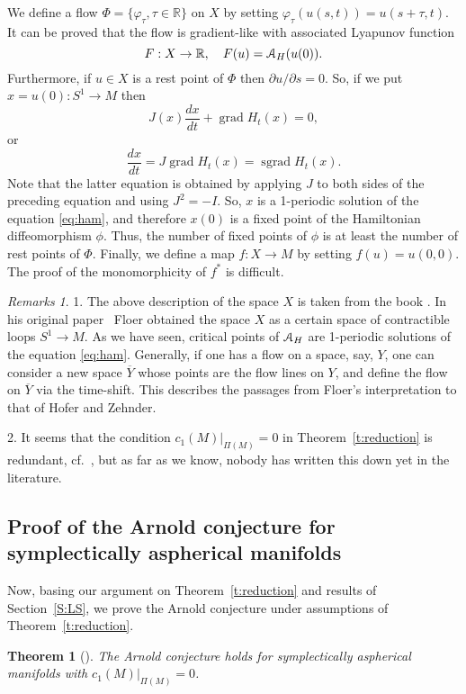 \documentclass[12pt]{amsart}
\newcommand{\B}[1]{{\mathbb #1}}
\newcommand{\C}[1]{{\EuScript #1}}
\newcommand\R{\B R}
\newtheorem{thm}[subsection]{Theorem}
\numberwithin{equation}{section}
\theoremstyle{definition}
\theoremstyle{remark}
\newtheorem{remarks}[subsection]{Remarks}
\newcommand\theoref{Theorem~\ref}
\numberwithin{figure}{section}
\numberwithin{table}{section}
\newcommand{\p}{{\partial}}
\newcommand{\gf}{{\varphi}}
\newcommand\grad{\operatorname{grad}}
\newcommand\sgrad{\operatorname{sgrad}}
\newcommand{\ms}{{\medskip}}
\def\ov{\overline}
\begin{document}
\ms 
We define a flow $\Phi=\{\gf_{\tau}, \tau\in \R\}$ on $X$ by setting  
$\gf_{\tau}(u(s,t))=u(s+\tau, t)$. It can be proved that the flow is  
gradient-like with associated Lyapunov function  
$$ 
F: X \to \R,\quad F(u)=\C A_H(u(0)). 
$$ 
Furthermore, if $u\in X$ is a rest point of $\Phi$ then $\p u /\p s=0$. So, if  
we put $x=u(0): S^1\to M$ then 
$$ 
J(x)\frac{dx}{dt}+\grad H_t(x)=0, 
$$ 
or 
$$ 
\frac{dx}{dt}=J\grad H_t(x)=\sgrad H_t(x). 
$$ 
Note that the latter equation is obtained by applying $J$ to both sides of the 
preceding   
equation and using $J^2=-I$. 
So, $x$ is a 1-periodic solution of the equation \eqref{eq:ham}, and therefore  
$x(0)$  
is a fixed point of the Hamiltonian diffeomorphism $\phi$. Thus, the number of  
fixed  
points of $\phi$ is at least the number of rest points of $\Phi$. 
\ms 
Finally, we define a map $f: X \to M$ by setting $f(u)=u(0,0)$. The proof of  
the monomorphicity of $f^*$ is difficult. 
\begin{remarks} 
1. The above description of the space $X$ is taken from the book \cite{HZ}.  
In his original paper~\cite{F} Floer obtained the space $X$ as a certain space 
of  
contractible loops $S^1\to M$. As we have seen, critical points of $\C A_H$ 
are 1-periodic solutions of the equation \eqref{eq:ham}. 
Generally, if one has a flow on a space, say,  
$Y$, one can consider a new space $\ov Y$ whose points are the flow lines on  
$Y$,  
and define the flow on $\ov Y$ via the time-shift. This describes the passages  
from Floer's interpretation to that of Hofer and Zehnder.  
 
2. It seems that the condition $c_1(M)|_{\Pi(M)}=0$ in \theoref{t:reduction} is  
redundant, cf.~\cite[Remark on p. 250]{HZ}, but as far as we know, nobody has 
written  
this down yet in the literature. 
\end{remarks} 
 
\subsection{Proof of the Arnold conjecture for symplectically aspherical  
manifolds} Now, basing  our argument on  \theoref{t:reduction} and results of  
Section~\ref{S:LS}, we prove the Arnold conjecture under assumptions of  
\theoref{t:reduction}. 
 
\begin{thm}[\cite{R2, RO}] 
The Arnold conjecture holds for symplectically aspherical manifolds with  
$c_1(M)|_{\Pi(M)}=0$. 
\end{thm} 
 
\end{document}
